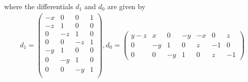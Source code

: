 \documentclass[11pt,reqno]{amsart}
\theoremstyle{definition}
\numberwithin{equation}{section}
\begin{document}
where the differentials $d_1$ and $d_0$ are given by
\begin{align*}
    d_1 = \begin{pmatrix}
        -x & 0 & 0 & 1 \\
        -z & 1 & 0 & 0 \\
         0 & -z & 1 & 0 \\
          0 & 0 & -z & 1 \\
          -y  & 1 & 0 & 0 \\
          0  & -y & 1 & 0 \\
           0 & 0 & -y & 1 \\
    \end{pmatrix},
    d_0 = \begin{pmatrix}
        y-z & x & 0 & -y & -x & 0 & z \\
        0 & -y & 1 & 0 & z & -1 & 0 \\
        0 & 0 & -y & 1 & 0 & z & -1
    \end{pmatrix}
\end{align*}
\end{document}
